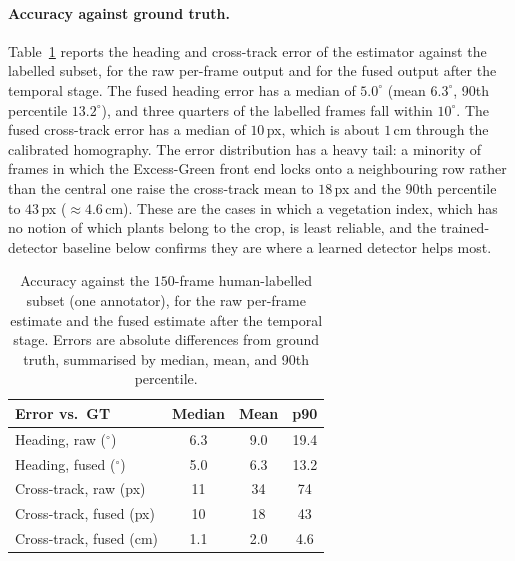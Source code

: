 \paragraph{Accuracy against ground truth.}
Table~\ref{tab:res-accuracy} reports the heading and cross-track error of the
estimator against the labelled subset, for the raw per-frame output and for the
fused output after the temporal stage. The fused heading error has a median
of $5.0^\circ$ (mean $6.3^\circ$, 90th percentile $13.2^\circ$), and three
quarters of the labelled frames fall within $10^\circ$. The fused cross-track
error has a median of $10$\,px, which is about $1$\,cm through the calibrated
homography. The error distribution has a heavy tail: a minority of frames in which
the Excess-Green front end locks onto a neighbouring row rather than the central
one raise the cross-track mean to $18$\,px and the 90th percentile to $43$\,px
($\approx4.6$\,cm). These are the cases in which a vegetation index, which has no notion
of which plants belong to the crop, is least reliable, and the trained-detector
baseline below confirms they are where a learned detector helps most.

{\renewcommand{\arraystretch}{1.3}
\begin{table}[!ht]
  \centering
  \caption{Accuracy against the $150$-frame human-labelled subset (one annotator),
    for the raw per-frame estimate and the fused estimate after the temporal
    stage. Errors are absolute differences from ground truth, summarised by median,
    mean, and 90th percentile.}
  \label{tab:res-accuracy}
  \begin{tabular}{lccc}
    \hline
    \textbf{Error vs.\ GT} & \textbf{Median} & \textbf{Mean} & \textbf{p90} \\
    \hline
    Heading, raw ($^\circ$)            & 6.3  & 9.0  & 19.4 \\
    Heading, fused ($^\circ$)          & 5.0  & 6.3  & 13.2 \\
    \hline
    Cross-track, raw (px)              & 11   & 34   & 74   \\
    Cross-track, fused (px)            & 10   & 18   & 43   \\
    Cross-track, fused (cm)            & 1.1  & 2.0  & 4.6  \\
    \hline
  \end{tabular}
\end{table}}

